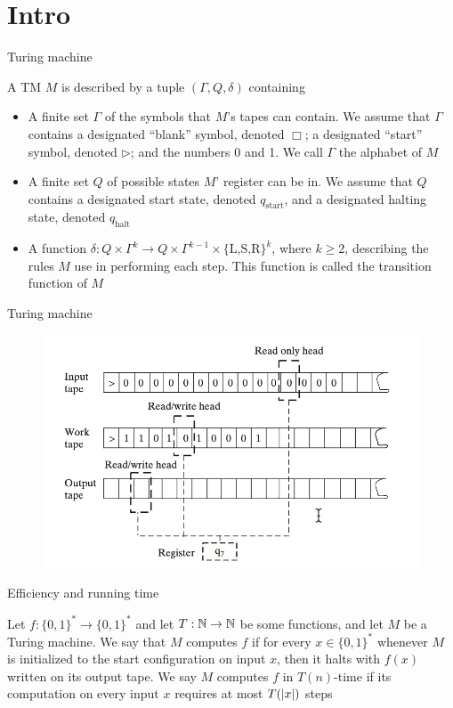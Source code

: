 \documentclass[presentation]{beamer}
\def \start {\text{start}}
\def \halt {\text{halt}}
\begin{document}
\section{Intro}
\label{sec:org2f2ca75}
\begin{frame}[label={sec:org028dd8d}]{Turing machine}
\begin{definition}[]
A TM \(M\) is described by a tuple \((\Gamma,Q,\delta)\) containing
\begin{itemize}
\item A finite set \(\Gamma\) of the symbols that \(M\)'s tapes can contain. We assume that \(\Gamma\) contains a
designated ``blank'' symbol, denoted \(\Box\); a designated ``start'' symbol, denoted \(\rhd\);
and the numbers 0 and 1. We call \(\Gamma\) the \alert{alphabet} of \(M\)
\item A finite set \(Q\) of possible states \(M\)' register can be in. We assume that \(Q\) contains
a designated start state, denoted \(q_{\start}\), and a designated halting state, denoted \(q_{\halt}\)
\item A function \(\delta:Q\times\Gamma^k\to Q\times\Gamma^{k-1}\times\{\text{L,S,R}\}^k\),
where \(k\ge2\), describing the rules \(M\) use in performing each step. This function is
called the \alert{transition function} of \(M\)
\end{itemize}
\end{definition}
\end{frame}
\begin{frame}[label={sec:org91ab064}]{Turing machine}
\begin{figure}[htbp]
\centering
\includegraphics[width=.7\textwidth]{./6.png}
\label{}
\end{figure}
\end{frame}
\begin{frame}[label={sec:org0b8d190}]{Efficiency and running time}
\begin{definition}
Let \(f:\{0,1\}^*\to\{0,1\}^*\) and let \(T:\mathbb{N}\to\mathbb{N}\) be some functions, and let \(M\) be a Turing
machine. We say that \(M\) \alert{computes} \(f\) if for every \(x\in\{0,1\}^*\) whenever \(M\) is
initialized to the start configuration on input \(x\), then it halts with \(f(x)\) written on
its output tape. We say \(M\) \alert{computes} \(f\) in \alert{\(T(n)\)-time} if its computation on every
input \(x\) requires at most \(T(\abs{x})\) steps
\end{definition}
\end{frame}
\end{document}

